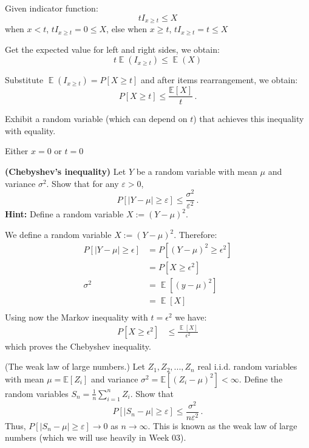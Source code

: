 \documentclass[a4paper,10pt]{article}
\DeclareMathOperator{\EX}{\mathbb{E}}%
\begin{document}
\begin{solution}

  Given indicator function:
    $$tI_{x\ge t} \le X$$
when $x<t$, $tI_{x\ge t}=0 \le X$,
else when $x\ge t$, $tI_{x\ge t}=t \le X$

Get the expected value for left and right sides, we obtain:
$$t\EX(I_{x\ge t}) \le \EX(X)$$

Substitute $\EX(I_{x\ge t}) = P[X \geq t]$ and after items rearrangement, we obtain:
	\[
	P[X \geq t] \leq \frac{\mathbb{E}[X]}{t}\, .
	\]
\end{solution}

\begin{subproblem}{1}
	Exhibit a random variable (which can depend on $t$) that achieves this inequality with equality.
\end{subproblem}

\begin{solution}
Either $x=0$ or $t=0$
\end{solution}

\begin{subproblem}{3} \textbf{(Chebyshev's inequality)} Let $Y$ be a random variable with mean $\mu$ and variance $\sigma^2$. Show that for any $\varepsilon > 0$,
	\[
	P[|Y - \mu| \geq \varepsilon] \leq \frac{\sigma^2}{\varepsilon^2} \, .
	\]
	\textbf{Hint:} Define a random variable $X := (Y - \mu)^2$.
\end{subproblem}

\begin{solution}
We define a random variable \(X := {(Y-\mu)}^2\). Therefore:
\begin{align*}
    P[|Y-\mu| \geq \epsilon]
    &= P[{(Y-\mu)}^2 \geq \epsilon^2] \\
    &= P[X\geq \epsilon^2]\\
    \sigma^2
    &= \EX[{(y-\mu)}^2]\\
    &= \EX[X]\\
\end{align*}
Using now the Markov inequality with \(t=\epsilon^2\) we have:
\begin{align*}
    P[X\geq \epsilon^2] &\leq \frac{\EX[X]}{\epsilon^2}
\end{align*}
which proves the Chebyshev inequality.

\end{solution}

\begin{subproblem}{3} (The weak law of large numbers.) Let $Z_1, Z_2, ..., Z_n$ real i.i.d. random variables with mean $\mu = \mathbb{E}[Z_i]$ and variance $\sigma^2 = \mathbb{E}[(Z_i - \mu)^2] < \infty$. Define the random variables $S_n = \frac{1}{n} \sum_{i=1}^n Z_i$. Show that
	\[
	P[|S_n - \mu | \geq \varepsilon] \leq \frac{\sigma^2}{n\varepsilon^2}\, .
	\]
	Thus, $P[|S_n - \mu| \geq \varepsilon] \to 0$ as $n \to \infty$. This is known as the weak law of large numbers (which we will use heavily in Week 03).
\end{subproblem}
\end{document}
